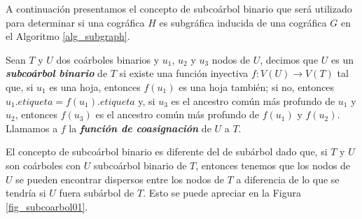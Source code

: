 A continuación presentamos el concepto de subcoárbol binario
que será utilizado para determinar si una cográfica $H$ es subgráfica
inducida de una cográfica $G$ en el Algoritmo \ref{alg_subgraph}.

Sean $T$ y $U$ dos coárboles binarios y $u_1$, $u_2$ y $u_3$ nodos de $U$, decimos
que $U$ es un \emph{\textbf{subcoárbol binario}} de $T$ si existe una función
inyectiva $f:V(U)\rightarrow V(T)$ tal que, si $u_1$ es una hoja, entonces $f(u_1)$
es una hoja también; si no, entonces $u_1.etiqueta = f(u_1).etiqueta$ y, si $u_3$ es
el ancestro común más profundo de $u_1$ y $u_2$, entonces $f(u_3)$ es el ancestro
común más profundo de $f(u_1)$ y $f(u_2)$. Llamamos a $f$ la \textbf{\emph{función de
coasignación}} de $U$ a $T$.

El concepto de subcoárbol binario es diferente del de subárbol dado que, si $T$ y $U$
son coárboles con $U$ subcoárbol binario de $T$, entonces tenemos que los nodos de
$U$ se pueden encontrar dispersos entre los nodos de $T$ a diferencia de lo que se
tendría si $U$ fuera subárbol de $T$. Esto se puede apreciar en la Figura
\ref{fig_subcoarbol01}.

